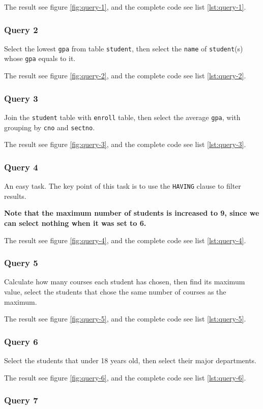 \documentclass[scheme=plain,12pt]{ctexart}
\newcommand{\result}[1]{

    The result see figure \ref{fig:query-#1}, and the complete code see list \ref{lst:query-#1}.

}
\begin{document}
    \result{1}

    \subsubsection{Query 2}

    Select the lowest \verb|gpa| from table \verb|student|, then select the \verb|name| of \verb|student|(s) whose \verb|gpa| equals to it.

    \result{2}

    \subsubsection{Query 3}

    Join the \verb|student| table with \verb|enroll| table, then select the average \verb|gpa|, with grouping by \verb|cno| and \verb|sectno|.

    \result{3}

    \subsubsection{Query 4}

    An easy task. The key point of this task is to use the \verb|HAVING| clause to filter results.

    \textbf{Note that the maximum number of students is increased to 9, since we can select nothing when it was set to 6.}

    \result{4}

    \subsubsection{Query 5}

    Calculate how many courses each student has chosen, then find its maximum value, select the students that chose the same number of courses as the maximum.

    \result{5}

    \subsubsection{Query 6}

    Select the students that under 18 years old, then select their major departments.

    \result{6}

    \subsubsection{Query 7}
\end{document}
